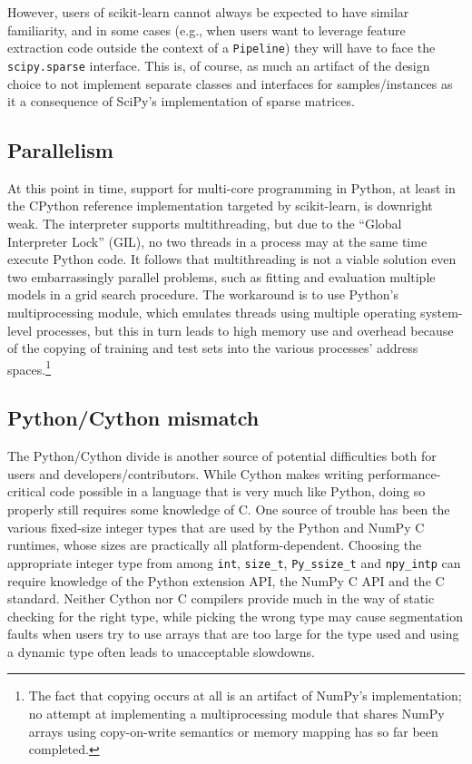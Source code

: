 \documentclass{llncs}
\begin{document}
However, users of scikit-learn cannot always be expected
to have similar familiarity, and in some cases
(e.g., when users want to leverage feature extraction code
outside the context of a \texttt{Pipeline})
they will have to face the \texttt{scipy.sparse} interface.
This is, of course, as much an artifact of the design choice
to not implement separate classes and interfaces for samples/instances
as it a consequence of SciPy's implementation of sparse matrices.

\subsection{Parallelism}

At this point in time, support for multi-core programming in Python,
at least in the CPython reference implementation targeted by scikit-learn,
is downright weak.
The interpreter supports multithreading, but due to the ``Global Interpreter Lock'' (GIL),
no two threads in a process may at the same time execute Python code.
It follows that multithreading is not a viable solution
even two embarrassingly parallel problems,
such as fitting and evaluation multiple models in a grid search procedure.
The workaround is to use Python's multiprocessing module,
which emulates threads using multiple operating system-level processes,
but this in turn leads to high memory use and overhead
because of the copying of training and test sets
into the various processes' address spaces.\footnote{
  The fact that copying occurs at all is an artifact of NumPy's implementation;
  no attempt at implementing a multiprocessing module
  that shares NumPy arrays using copy-on-write semantics or memory mapping
  has so far been completed.}

\subsection{Python/Cython mismatch}

The Python/Cython divide is another source of potential difficulties
both for users and developers/contributors.
While Cython makes writing performance-critical code possible
in a language that is very much like Python,
doing so properly still requires some knowledge of C.
One source of trouble has been the various fixed-size integer types
that are used by the Python and NumPy C runtimes,
whose sizes are practically all platform-dependent.
Choosing the appropriate integer type from among
\texttt{int}, \texttt{size\_t}, \texttt{Py\_ssize\_t} and \texttt{npy\_intp}
can require knowledge of the Python extension API,
the NumPy C API and the C standard.
Neither Cython nor C compilers provide much in the way of static checking
for the right type,
while picking the wrong type may cause segmentation faults
when users try to use arrays that are too large for the type used
and using a dynamic type often leads to unacceptable slowdowns.
\end{document}
